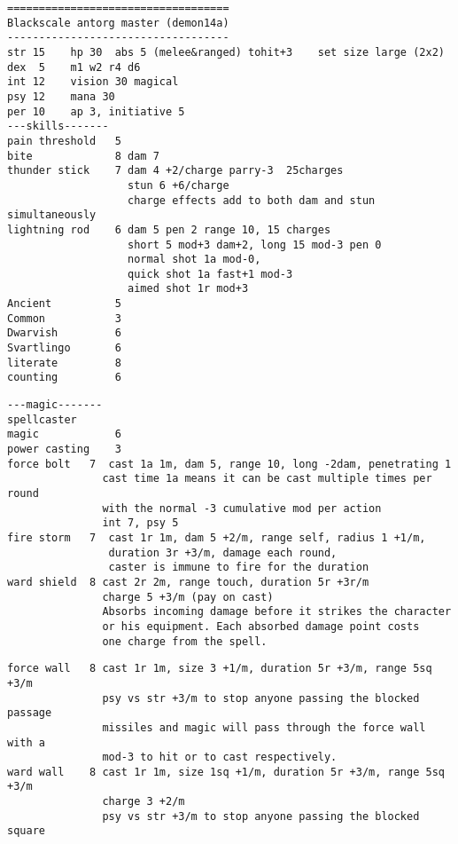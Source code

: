 \goodbreak \begin{samepage} \small \begin{verbatim}
===================================
Blackscale antorg master (demon14a)
-----------------------------------
str 15    hp 30  abs 5 (melee&ranged) tohit+3    set size large (2x2)
dex  5    m1 w2 r4 d6
int 12    vision 30 magical
psy 12    mana 30
per 10    ap 3, initiative 5
---skills-------
pain threshold   5
bite             8 dam 7
thunder stick    7 dam 4 +2/charge parry-3  25charges
                   stun 6 +6/charge
                   charge effects add to both dam and stun simultaneously
lightning rod    6 dam 5 pen 2 range 10, 15 charges
                   short 5 mod+3 dam+2, long 15 mod-3 pen 0
                   normal shot 1a mod-0,
                   quick shot 1a fast+1 mod-3
                   aimed shot 1r mod+3
Ancient          5
Common           3
Dwarvish         6
Svartlingo       6
literate         8
counting         6
\end{verbatim} \end{samepage} \goodbreak \begin{samepage} \begin{verbatim}
---magic-------
spellcaster
magic            6
power casting    3
force bolt   7  cast 1a 1m, dam 5, range 10, long -2dam, penetrating 1
               cast time 1a means it can be cast multiple times per round
               with the normal -3 cumulative mod per action
               int 7, psy 5
fire storm   7  cast 1r 1m, dam 5 +2/m, range self, radius 1 +1/m,
                duration 3r +3/m, damage each round,
                caster is immune to fire for the duration
ward shield  8 cast 2r 2m, range touch, duration 5r +3r/m
               charge 5 +3/m (pay on cast)
               Absorbs incoming damage before it strikes the character
               or his equipment. Each absorbed damage point costs
               one charge from the spell.
\end{verbatim} \end{samepage} \goodbreak \begin{samepage} \begin{verbatim}
force wall   8 cast 1r 1m, size 3 +1/m, duration 5r +3/m, range 5sq +3/m
               psy vs str +3/m to stop anyone passing the blocked passage
               missiles and magic will pass through the force wall with a
               mod-3 to hit or to cast respectively.
ward wall    8 cast 1r 1m, size 1sq +1/m, duration 5r +3/m, range 5sq +3/m
               charge 3 +2/m
               psy vs str +3/m to stop anyone passing the blocked square

\end{verbatim}
\end{samepage}
